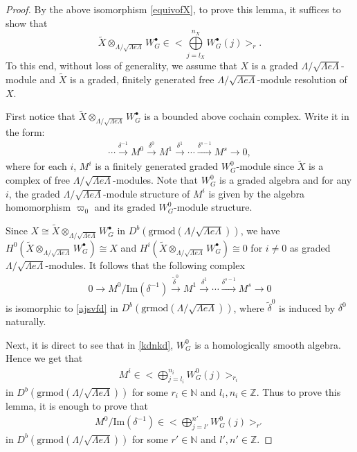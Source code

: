 \documentclass[11pt,reqno]{amsart}
\theoremstyle{definition}
\begin{document}
\begin{proof}By
the above isomorphism
\eqref{equivofX},
to prove this lemma, it suffices to show that 
$$
\tilde{X} \otimes_{\Lambda / \sqrt{\Lambda e \Lambda}} W_G^{\bullet} 
\in \big< \bigoplus\limits_{j= l_X}^{n_X} W_G^{\bullet}(j) \big>_{r}. 
$$
To this end, without loss of generality, we 
assume that $X$ is a graded 
$\Lambda /\sqrt{\Lambda e \Lambda}$-module and $\tilde{X}$ is a graded, finitely 
generated free $\Lambda / \sqrt{\Lambda e \Lambda}$-module resolution of $X$. 

First notice
that $\tilde{X} \otimes_{\Lambda /\sqrt{\Lambda e \Lambda}} 
W_G^{\bullet}$ is a bounded above cochain complex. Write it in the form: 
\begin{align}\label{ajsvfd}
\cdots \xrightarrow{\delta^{-1}} M^0 \xrightarrow{\delta^0} M^1 
\xrightarrow{\delta^1} \cdots \xrightarrow{\delta^{s-1}} M^s \longrightarrow 0, 
\end{align}
where for each $i$,
 $M^i$ is a finitely generated graded $W_G^{0}$-module since 
 $\tilde{X}$ is a complex of free $\Lambda / \sqrt{\Lambda e \Lambda}$-modules. 
Note that $W_G^{0}$ is a graded algebra and for any $i$, 
the graded $\Lambda /\sqrt{\Lambda e \Lambda}$-module structure of 
$M^i$ is given by the algebra homomorphism 
$\varpi_0$ and its graded $W_G^{0}$-module structure. 

Since $ X \cong \tilde{X} \otimes_{\Lambda / \sqrt{\Lambda e \Lambda}} 
W_G^{\bullet}$ in $D^{b}(\mathrm{grmod}(\Lambda / \sqrt{\Lambda e \Lambda}) )$, 
we have $H^0( \tilde{X} \otimes_{\Lambda / \sqrt{\Lambda e \Lambda}} 
W_G^{\bullet} ) \cong X$ and $ H^i( \tilde{X} \otimes_{\Lambda / 
\sqrt{\Lambda e \Lambda}} W_G^{\bullet} ) \cong 0$ for $i \neq 0$ 
 as graded 
 $\Lambda /\sqrt{\Lambda e \Lambda}$-modules.  
It follows that the following complex
\begin{align}\label{kdnkd}
0 \longrightarrow M^0 / \mathrm{Im}(\delta^{-1})  \xrightarrow{\tilde{\delta}^0} M^1 
\xrightarrow{\delta^1} \cdots \xrightarrow{\delta^{s-1}} M^s \longrightarrow 0
\end{align}
is isomorphic to \eqref{ajsvfd} in $D^{b}(\mathrm{grmod}(\Lambda / \sqrt{\Lambda e \Lambda}) )$, 
where $\tilde{\delta}^0$ is induced by $\delta^0$ naturally. 

Next, it is direct to see that
in \eqref{kdnkd},
$W_G^{0}$ 
is a homologically 
smooth algebra. Hence we get that 
\begin{align*}%
M^i \in \big< \bigoplus\limits_{j= l_i}^{n_i} W_G^{0}(j) \big>_{r_i}
\end{align*}
in $D^{b}(\mathrm{grmod}(\Lambda / \sqrt{\Lambda e \Lambda}) )$ for some
$r_i \in \mathbb{N}$ and $l_i, n_i \in \mathbb{Z}$.
Thus to prove this lemma, it is enough to prove that 
\begin{align}\label{dbdoifnb}
M^0 / \mathrm{Im}(\delta^{-1}) \in \big< \bigoplus\limits_{j= l'}^{n'} W_G^{0}(j) \big>_{r'}
\end{align}
in $D^{b}(\mathrm{grmod}(\Lambda / \sqrt{\Lambda e \Lambda}) )$ for some
$r' \in \mathbb{N}$ and $l', n' \in \mathbb{Z}$. 


\end{proof}
\end{document}
